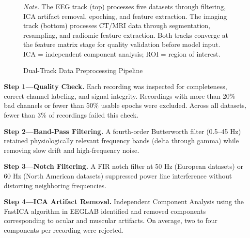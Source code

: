 \begin{figure}[H]
{%
    }
    \caption{Dual-Track Data Preprocessing Pipeline}
    \label{fig:preproc_pipeline}
    \vspace{0.5em}\noindent\textit{Note.} The EEG track (top) processes five datasets through filtering, ICA artifact removal, epoching, and feature extraction. The imaging track (bottom) processes CT/MRI data through segmentation, resampling, and radiomic feature extraction. Both tracks converge at the feature matrix stage for quality validation before model input. ICA = independent component analysis; ROI = region of interest.
\end{figure}

\textbf{Step 1---Quality Check.} Each recording was inspected for completeness, correct channel labeling, and signal integrity. Recordings with more than 20\% bad channels or fewer than 50\% usable epochs were excluded. Across all datasets, fewer than 3\% of recordings failed this check.

\textbf{Step 2---Band-Pass Filtering.} A fourth-order Butterworth filter (0.5--45 Hz) retained physiologically relevant frequency bands (delta through gamma) while removing slow drift and high-frequency noise.

\textbf{Step 3---Notch Filtering.} A FIR notch filter at 50 Hz (European datasets) or 60 Hz (North American datasets) suppressed power line interference without distorting neighboring frequencies.

\textbf{Step 4---ICA Artifact Removal.} Independent Component Analysis \citep{makeig1996ica} using the FastICA algorithm in EEGLAB \citep{delorme2004eeglab} identified and removed components corresponding to ocular and muscular artifacts. On average, two to four components per recording were rejected.


